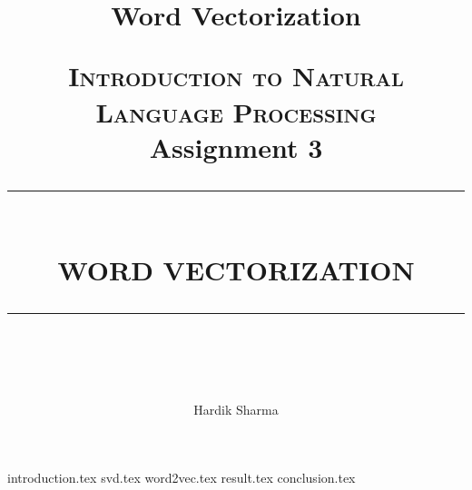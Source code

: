 \documentclass[a4paper,9pt]{report}
\title{Word Vectorization}
\newcommand{\HRule}[1]{\rule{\linewidth}{#1}}
\begin{document}
\title{ \normalsize \textsc{\LARGE Introduction to Natural Language Processing}
		\\ [2.0cm]
        \LARGE Assignment 3 
		\HRule{0.5pt} \\
		\LARGE \textbf{\uppercase{Word Vectorization}}
		\HRule{2pt} \\ [0.5cm]
		\normalsize \vspace*{3\baselineskip}}
        \date{ }

\author{Hardik Sharma}

\maketitle

{introduction.tex}
{svd.tex}
{word2vec.tex}
{result.tex}
{conclusion.tex}
\end{document}
